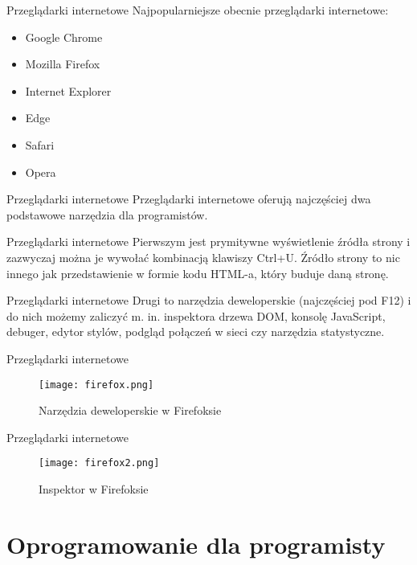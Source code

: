 \begin{frame}{Przeglądarki internetowe}	
	Najpopularniejsze obecnie przeglądarki internetowe:	
	\begin{itemize}
		\item Google Chrome
		\item Mozilla Firefox
		\item Internet Explorer
		\item Edge
		\item Safari
		\item Opera
	\end{itemize}
\end{frame}

\begin{frame}{Przeglądarki internetowe}	
	Przeglądarki internetowe oferują najczęściej dwa podstawowe narzędzia dla programistów.
\end{frame}

\begin{frame}{Przeglądarki internetowe}		
	Pierwszym jest prymitywne wyświetlenie źródła strony i zazwyczaj można je wywołać kombinacją klawiszy Ctrl+U. Źródło strony to nic innego jak przedstawienie w formie kodu HTML-a, który buduje daną stronę.
\end{frame}

\begin{frame}{Przeglądarki internetowe}	
	Drugi to narzędzia deweloperskie (najczęściej pod F12) i do nich możemy zaliczyć m. in. inspektora drzewa DOM, konsolę JavaScript, debuger, edytor stylów, podgląd połączeń w sieci czy narzędzia statystyczne.
\end{frame}

\begin{frame}{Przeglądarki internetowe}
	\begin{figure}[t]
		\centering
		\texttt{[image: firefox.png]}
		\caption{Narzędzia deweloperskie w Firefoksie}
	\end{figure}
\end{frame}

\begin{frame}{Przeglądarki internetowe}
	\begin{figure}[t]
		\centering
		\texttt{[image: firefox2.png]}
		\caption{Inspektor w Firefoksie}
	\end{figure}
\end{frame}

\section{Oprogramowanie dla programisty}

